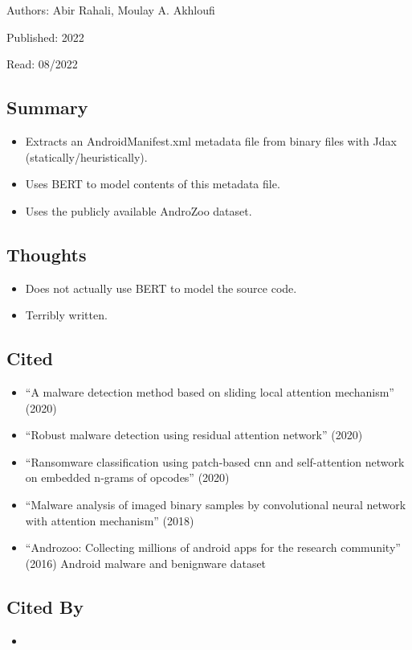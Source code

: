 \documentclass{article}
\begin{document}
\noindent Authors: Abir Rahali, Moulay A. Akhloufi

\noindent Published: 2022

\noindent Read: 08/2022

\subsection*{Summary}
\begin{itemize}
\item Extracts an AndroidManifest.xml metadata file from binary files with Jdax (statically/heuristically).
\item Uses BERT to model contents of this metadata file.
\item Uses the publicly available AndroZoo dataset.
\end{itemize}

\subsection*{Thoughts}
\begin{itemize}
\item Does not actually use BERT to model the source code.
\item Terribly written.
\end{itemize}

\subsection*{Cited}
\begin{itemize}
\item ``A malware detection method based on sliding local attention mechanism'' (2020)
\item ``Robust malware detection using residual attention network'' (2020)
\item ``Ransomware classification using patch-based cnn and self-attention network on embedded n-grams of opcodes'' (2020)
\item ``Malware analysis of imaged binary samples by convolutional neural network with attention mechanism'' (2018)
\item ``Androzoo: Collecting millions of android apps for the research community'' (2016) Android malware and benignware dataset
\end{itemize}

\subsection*{Cited By}
\begin{itemize}
\item 
\end{itemize}
\end{document}
